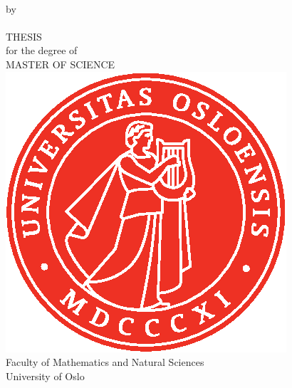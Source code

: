 \thispagestyle{empty}
\begin{center} \vspace{1cm}
    \textbf{\Large{\mtitle}}\\ \vspace{0.5cm}
    \small{by}\\ \vspace{0.5cm}
    \large{\mauthor}\\ \vspace{4.4cm}
    \large{THESIS}\\ \vspace{0.3cm}
    \small{for the degree of}\\ \vspace{0.3cm}
    \large{MASTER OF SCIENCE}\\ \vspace{0.7cm}
    \includegraphics[scale=1.0]{text/UiO_Segl_pms485.eps} \\ \vspace{0.5cm}
    \large{Faculty of Mathematics and Natural Sciences \\ University of Oslo} \\ \vspace{0.5cm}
    \small{\mdate}\\ \vfill
\end{center}

